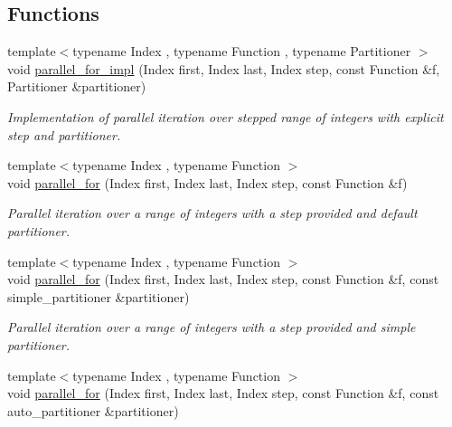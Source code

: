 \subsection*{Functions}
{\bf }\par
\begin{DoxyCompactItemize}
\item 
\hypertarget{namespacetbb_1_1strict__ppl_af7e92accea40b9e372385af8f21d74b0}{}{\footnotesize template$<$typename Index , typename Function , typename Partitioner $>$ }\\void \hyperlink{namespacetbb_1_1strict__ppl_af7e92accea40b9e372385af8f21d74b0}{parallel\+\_\+for\+\_\+impl} (Index first, Index last, Index step, const Function \&f, Partitioner \&partitioner)\label{namespacetbb_1_1strict__ppl_af7e92accea40b9e372385af8f21d74b0}

\begin{DoxyCompactList}\small\item\em Implementation of parallel iteration over stepped range of integers with explicit step and partitioner. \end{DoxyCompactList}\item 
\hypertarget{namespacetbb_1_1strict__ppl_a2a08fe076bb27638b30e570bcd37aaa5}{}{\footnotesize template$<$typename Index , typename Function $>$ }\\void \hyperlink{namespacetbb_1_1strict__ppl_a2a08fe076bb27638b30e570bcd37aaa5}{parallel\+\_\+for} (Index first, Index last, Index step, const Function \&f)\label{namespacetbb_1_1strict__ppl_a2a08fe076bb27638b30e570bcd37aaa5}

\begin{DoxyCompactList}\small\item\em Parallel iteration over a range of integers with a step provided and default partitioner. \end{DoxyCompactList}\item 
\hypertarget{namespacetbb_1_1strict__ppl_aa357fd51d9efd065151d40230a9d20e9}{}{\footnotesize template$<$typename Index , typename Function $>$ }\\void \hyperlink{namespacetbb_1_1strict__ppl_aa357fd51d9efd065151d40230a9d20e9}{parallel\+\_\+for} (Index first, Index last, Index step, const Function \&f, const simple\+\_\+partitioner \&partitioner)\label{namespacetbb_1_1strict__ppl_aa357fd51d9efd065151d40230a9d20e9}

\begin{DoxyCompactList}\small\item\em Parallel iteration over a range of integers with a step provided and simple partitioner. \end{DoxyCompactList}\item 
\hypertarget{namespacetbb_1_1strict__ppl_af5b5de4583b861131613e1c91f3f507e}{}{\footnotesize template$<$typename Index , typename Function $>$ }\\void \hyperlink{namespacetbb_1_1strict__ppl_af5b5de4583b861131613e1c91f3f507e}{parallel\+\_\+for} (Index first, Index last, Index step, const Function \&f, const auto\+\_\+partitioner \&partitioner)\label{namespacetbb_1_1strict__ppl_af5b5de4583b861131613e1c91f3f507e}


\end{DoxyCompactItemize}
